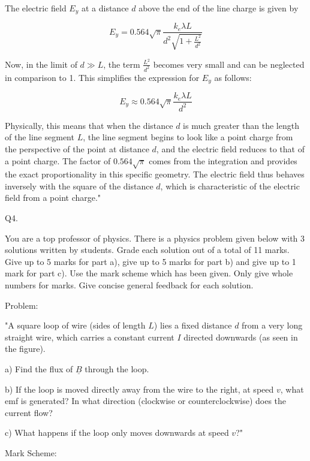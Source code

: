 The electric field \( E_y \) at a distance \( d \) above the end of the line charge is given by

\[ E_y = 0.564 \sqrt{\pi} \frac{k_e \lambda L}{d^2 \sqrt{1 + \frac{L^2}{d^2}}} \]

Now, in the limit of \( d \gg L \), the term \( \frac{L^2}{d^2} \) becomes very small and can be neglected in comparison to 1. This simplifies the expression for \( E_y \) as follows:

\[ E_y \approx 0.564 \sqrt{\pi} \frac{k_e \lambda L}{d^2} \]

Physically, this means that when the distance \( d \) is much greater than the length of the line segment \( L \), the line segment begins to look like a point charge from the perspective of the point at distance \( d \), and the electric field reduces to that of a point charge. The factor of \( 0.564 \sqrt{\pi} \) comes from the integration and provides the exact proportionality in this specific geometry. The electric field thus behaves inversely with the square of the distance \( d \), which is characteristic of the electric field from a point charge."



                           Q4. 

You are a top professor of physics. There is a physics problem given below with 3 solutions written by students. Grade each solution out of a total of 11 marks. Give up to 5 marks for part a), give up to 5 marks for part b) and give up to 1 mark for part c). Use the mark scheme which has been given. Only give whole numbers for marks. Give concise general feedback for each solution. 

Problem:

"A square loop of wire (sides of length \( L \)) lies a fixed distance \( d \) from a very long straight wire, which carries a constant current \( I \) directed downwards (as seen in the figure).

a) Find the flux of \( \underline{B} \) through the loop.

b) If the loop is moved directly away from the wire to the right, at speed \( v \), what emf is generated? In what direction (clockwise or counterclockwise) does the current flow?

c) What happens if the loop only moves downwards at speed \( v \)?"

Mark Scheme:

